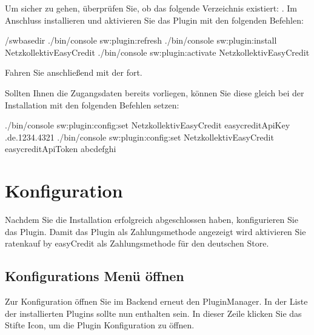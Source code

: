 \documentclass[a4paper,10pt,openany,oneside,ngerman]{sphinxmanual}
\begin{document}
Um sicher zu gehen, überprüfen Sie, ob das folgende Verzeichnis existiert: . Im Anschluss installieren und aktivieren Sie das Plugin mit den folgenden Befehlen:

\begin{sphinxVerbatim}[commandchars=\\\{\}]
  /sw\PYGZhy{}base\PYGZhy{}dir
 ./bin/console sw:plugin:refresh
 ./bin/console sw:plugin:install NetzkollektivEasyCredit
 ./bin/console sw:plugin:activate NetzkollektivEasyCredit
\end{sphinxVerbatim}

Fahren Sie anschließend mit der {\hyperref[\detokenize{configuration:configuration}]{}} fort.

Sollten Ihnen die Zugangsdaten bereits vorliegen, können Sie diese gleich bei der Installation mit den folgenden Befehlen setzen:

\begin{sphinxVerbatim}[commandchars=\\\{\}]
 ./bin/console sw:plugin:config:set NetzkollektivEasyCredit easycreditApiKey .de.1234.4321
 ./bin/console sw:plugin:config:set NetzkollektivEasyCredit easycreditApiToken abc\PYGZhy{}def\PYGZhy{}ghi
\end{sphinxVerbatim}


\chapter{Konfiguration}
\label{\detokenize{configuration:konfiguration}}\label{\detokenize{configuration:configuration}}\label{\detokenize{configuration::doc}}
Nachdem Sie die Installation erfolgreich abgeschlossen haben, konfigurieren Sie das Plugin. Damit das Plugin als Zahlungsmethode angezeigt wird aktivieren Sie ratenkauf by easyCredit als Zahlungsmethode für den deutschen Store.


\section{Konfigurations Menü öffnen}
\label{\detokenize{configuration:konfigurations-menu-offnen}}
Zur Konfiguration öffnen Sie im Backend erneut den Plugin\sphinxhyphen{}Manager. In der Liste der installierten Plugins sollte nun  enthalten sein.
In dieser Zeile klicken Sie das Stifte Icon, um die Plugin Konfiguration zu öffnen.
\end{document}
